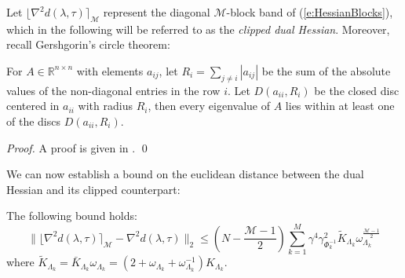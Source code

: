 Let $\lfloor \nabla^2 d(\lambda, \tau) \rceil_{\mathcal{M}}$ represent the diagonal $\mathcal{M}$-block band of (\ref{e:HessianBlocks}), which in the following will be referred to as the \emph{clipped dual Hessian}. Moreover, recall Gershgorin's circle theorem:
\begin{theorem} \label{l:Gerschgorin}
For $A \in \mathbb{R}^{n \times n}$ with elements $a_{ij}$, let $R_i = \sum_{j \neq i} | a_{ij} |$ be the sum of the absolute values of the non-diagonal entries in the row $i$. Let $D(a_{ii},R_i)$ be the closed disc centered in $a_{ii}$ with radius $R_i$, then every eigenvalue of $A$ lies within at least one of the discs $D(a_{ii}, R_i)$.
\end{theorem}
\begin{proof}
A proof is given in \cite{HornR2013}.
\qed
\end{proof}
We can now establish a bound on the euclidean distance between the dual Hessian and its clipped counterpart:
\begin{lemma} \label{l:EuclidianDistance}
The following bound holds:
\begin{equation} \label{e:EuclidianDistance}
\| \lfloor \nabla^2 d(\lambda, \tau) \rceil_{\mathcal{M}} - \nabla^2 d(\lambda, \tau) \|_2 \leq \left( N -\frac{\mathcal{M} - 1}{2} \right) \sum_{k=1}^M \gamma^4 \gamma_{\Phi_k^{-1}}^2 \tilde{K}_{\Lambda_k} \omega_{\Lambda_k}^{\frac{\mathcal{M} - 1}{2}}
\end{equation}
where $\tilde{K}_{\Lambda_k} = \bar{K}_{\Lambda_k} \omega_{\Lambda_k} =  (2 + \omega_{\Lambda_k} + \omega_{\Lambda_k}^{-1}) K_{\Lambda_k}$.
\end{lemma}
